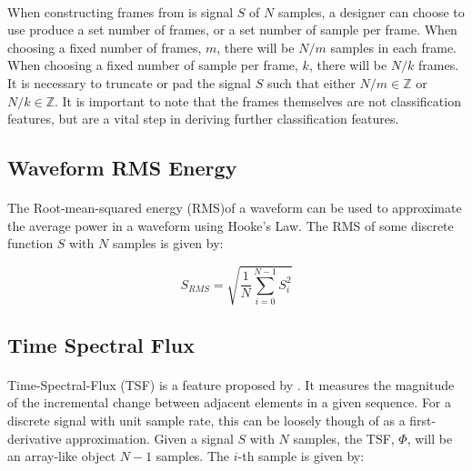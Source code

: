 \documentclass[12pt,letterpaper]{article}
\begin{document}
\paragraph*{}When constructing frames from is signal $S$ of $N$ samples, a designer can choose to use produce a set number of frames, or a set number of sample per frame. When choosing a fixed number of frames, $m$, there will be $N/m$ samples in each frame. When choosing a fixed number of sample per frame, $k$, there will be $N/k$ frames. It is necessary to truncate or pad the signal $S$ such that either $N/m \in \mathbb{Z}$ or $N/k \in \mathbb{Z}$. It is important to note that the frames themselves are not classification features, but are a vital step in deriving further classification features.


\subsection{Waveform RMS Energy}

\paragraph*{}The Root-mean-squared energy (RMS)of a waveform can be used to approximate the average power in a waveform using Hooke's Law. The RMS of some discrete function $S$ with $N$ samples is given by:

\begin{equation}
\label{RMS}
S_{RMS} = \sqrt{\frac{1}{N}\sum_{i=0}^{N-1}S_i^2}
\end{equation}



\subsection{Time Spectral Flux}

\paragraph*{}Time-Spectral-Flux (TSF) is a feature proposed by \cite{Kahn 2006}. It measures the magnitude of the incremental change between adjacent elements in a given sequence. For a discrete signal with unit sample rate, this can be loosely though of as a first-derivative approximation. Given a signal $S$ with $N$ samples, the TSF, $\Phi$, will be an array-like object $N-1$ samples. The $i$-th sample is given by:
\end{document}
